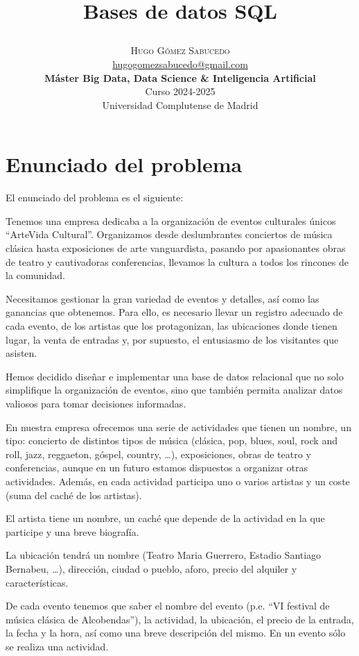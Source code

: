\documentclass[a4paper,onecolumn]{article}
\title{\begin{center} \Huge Bases de datos SQL \end{center}} %
\author{
    \textsc{\Huge Hugo Gómez Sabucedo} \\ %
    \large \href{mailto:hugogomezsabucedo@gmail.com}{hugogomezsabucedo@gmail.com} \\ [2ex] %
    \Large \textbf{Máster Big Data, Data Science \& Inteligencia Artificial} \\
    \normalsize Curso 2024-2025 \\
    \large Universidad Complutense de Madrid
}
\date{} %
\let\stdsection\section
\renewcommand\section{\newpage\stdsection}
\begin{document}
\maketitle
\begin{sloppypar}


\section{Enunciado del problema} \label{enunciado}
El enunciado del problema es el siguiente:

Tenemos una empresa dedicaba a la organización de eventos culturales únicos “ArteVida Cultural”. Organizamos desde deslumbrantes
conciertos de música clásica hasta exposiciones de arte vanguardista, pasando por apasionantes obras de teatro y cautivadoras
conferencias, llevamos la cultura a todos los rincones de la comunidad.

Necesitamos gestionar la gran variedad de eventos y detalles, así como las ganancias que obtenemos. Para ello, es
necesario llevar un registro adecuado de cada evento, de los artistas que los protagonizan, las ubicaciones donde
tienen lugar, la venta de entradas y, por supuesto, el entusiasmo de los visitantes que asisten.

Hemos decidido diseñar e implementar una base de datos relacional que no solo simplifique la organización de
eventos, sino que también permita analizar datos valiosos para tomar decisiones informadas.

En nuestra empresa ofrecemos una serie de actividades que tienen un nombre, un tipo: concierto de distintos tipos
de música (clásica, pop, blues, soul, rock and roll, jazz, reggaeton, góspel, country, …), exposiciones, obras de teatro
y conferencias, aunque en un futuro estamos dispuestos a organizar otras actividades. Además, en cada actividad
participa uno o varios artistas y un coste (suma del caché de los artistas).

El artista tiene un nombre, un caché que depende de la actividad en la que participe y una breve biografía.

La ubicación tendrá un nombre (Teatro Maria Guerrero, Estadio Santiago Bernabeu, …), dirección, ciudad o pueblo,
aforo, precio del alquiler y características.

De cada evento tenemos que saber el nombre del evento (p.e. “VI festival de música clásica de Alcobendas”), la
actividad, la ubicación, el precio de la entrada, la fecha y la hora, así como una breve descripción del mismo. En un
evento sólo se realiza una actividad.


\end{sloppypar}
\end{document}
